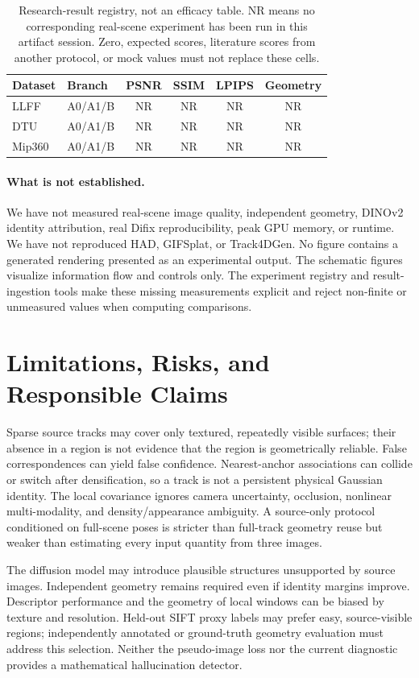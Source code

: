 \documentclass[10pt,twocolumn,letterpaper]{article}
\newcommand{\NR}{\textsf{NR}}
\begin{document}
\begin{table}[t]
\centering\small
\begin{tabular}{llcccc}
\toprule
Dataset & Branch & PSNR & SSIM & LPIPS & Geometry\\
\midrule
LLFF & A0/A1/B & \NR & \NR & \NR & \NR\\
DTU & A0/A1/B & \NR & \NR & \NR & \NR\\
Mip360 & A0/A1/B & \NR & \NR & \NR & \NR\\
\bottomrule
\end{tabular}
\caption{Research-result registry, not an efficacy table. \NR{} means no corresponding real-scene experiment has been run in this artifact session. Zero, expected scores, literature scores from another protocol, or mock values must not replace these cells.}
\label{tab:registry}
\end{table}

\paragraph{What is not established.} We have not measured real-scene image quality, independent geometry, DINOv2 identity attribution, real Difix reproducibility, peak GPU memory, or runtime. We have not reproduced HAD, GIFSplat, or Track4DGen. No figure contains a generated rendering presented as an experimental output. The schematic figures visualize information flow and controls only. The experiment registry and result-ingestion tools make these missing measurements explicit and reject non-finite or unmeasured values when computing comparisons.

\section{Limitations, Risks, and Responsible Claims}
Sparse source tracks may cover only textured, repeatedly visible surfaces; their absence in a region is not evidence that the region is geometrically reliable. False correspondences can yield false confidence. Nearest-anchor associations can collide or switch after densification, so a track is not a persistent physical Gaussian identity. The local covariance ignores camera uncertainty, occlusion, nonlinear multi-modality, and density/appearance ambiguity. A source-only protocol conditioned on full-scene poses is stricter than full-track geometry reuse but weaker than estimating every input quantity from three images.

The diffusion model may introduce plausible structures unsupported by source images. Independent geometry remains required even if identity margins improve. Descriptor performance and the geometry of local windows can be biased by texture and resolution. Held-out SIFT proxy labels may prefer easy, source-visible regions; independently annotated or ground-truth geometry evaluation must address this selection. Neither the pseudo-image loss nor the current diagnostic provides a mathematical hallucination detector.
\end{document}
